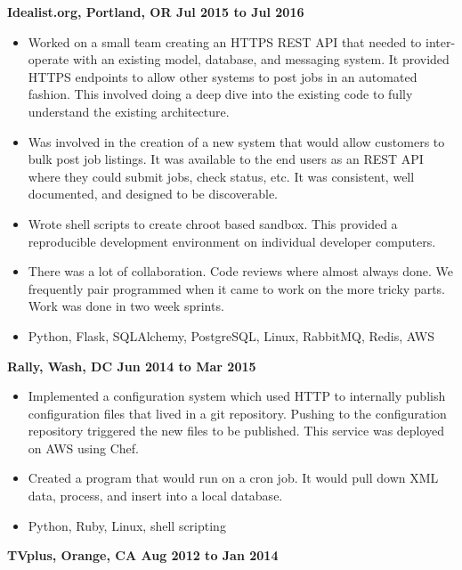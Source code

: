 \documentclass{res}
\begin{document}
\begin{resume}
\begin{itemize}
  \end{itemize}

  {\large \bf Idealist.org, Portland, OR \hfill Jul 2015 to Jul 2016}
  \begin{itemize}
    \item
    Worked on a small team creating an HTTPS REST API that needed
    to inter-operate with an existing model, database, and messaging
    system. It provided HTTPS endpoints to allow other systems to post
    jobs in an automated fashion.  This involved doing
    a deep dive into the existing code to fully understand the existing
    architecture.
    \item
    Was involved in the creation of a new system that would allow
    customers to bulk post job listings.  It was available to the end users
    as an REST API where they could submit jobs, check status, etc.
    It was consistent, well documented, and designed to be discoverable.
    \item
    Wrote shell scripts to create chroot based sandbox.  This provided
    a reproducible development environment on individual developer
    computers.
    \item
    There was a lot of collaboration.  Code reviews where almost always
    done.  We frequently pair programmed when it came to work on the
    more tricky parts.  Work was done in two week sprints.
  \item
    Python, Flask, SQLAlchemy, PostgreSQL, Linux, RabbitMQ, Redis, AWS
  \end{itemize}

  {\large \bf Rally, Wash, DC \hfill Jun 2014 to Mar 2015}

  \begin{itemize}

  \item
    Implemented a configuration system which used HTTP to
    internally publish configuration files that lived in a git repository.
    Pushing to the configuration repository triggered the new files
    to be published.  This service was deployed on AWS using Chef.
  \item
    Created a program that would run on a cron job.  It would pull down
    XML data, process, and insert into a local database.
  \item
    Python, Ruby, Linux, shell scripting

  \end{itemize}

  {\large \bf TVplus, Orange, CA \hfill Aug 2012 to Jan 2014}


\end{resume}
\end{document}
